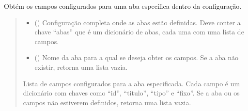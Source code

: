 \documentclass[letterpaper,10pt,english]{sphinxmanual}
\begin{document}
\begin{fulllineitems}
\label{\detokenize{api/config:config.get_sheet_campos}}
\pysigstartsignatures
\pysiglinewithargsret
{}
{\sphinxparamcomma {}}
{}
\pysigstopsignatures
\sphinxAtStartPar
Obtém os campos configurados para uma aba específica dentro da configuração.
\begin{quote}\begin{description}
\begin{itemize}
\item {} 
\sphinxAtStartPar
{} () \textendash{} Configuração completa onde as abas estão definidas. Deve conter a chave “abas” que é um dicionário de abas, cada uma com uma lista de campos.

\item {} 
\sphinxAtStartPar
{} () \textendash{} Nome da aba para a qual se deseja obter os campos. Se a aba não existir, retorna uma lista vazia.

\end{itemize}

\sphinxAtStartPar
Lista de campos configurados para a aba especificada. Cada campo é um dicionário com chaves como “id”, “titulo”, “tipo” e “fixo”. Se a aba ou os campos não estiverem definidos, retorna uma lista vazia.

\sphinxAtStartPar
{}

\end{description}\end{quote}

\end{fulllineitems}

\end{document}
